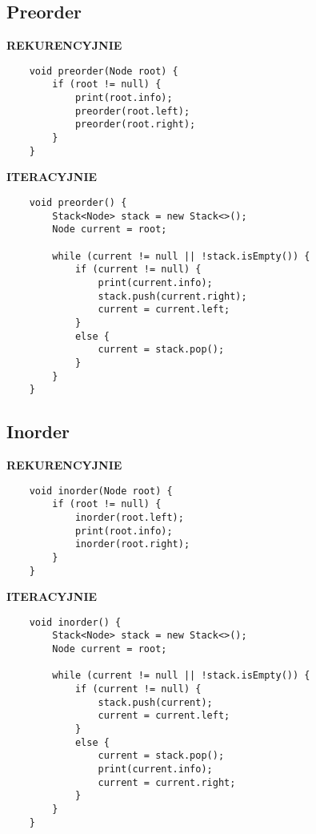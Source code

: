 \documentclass[algorytmy.tex]{subfiles}
\begin{document}
    \subsection{Preorder}
        \textbf{REKURENCYJNIE}
\begin{verbatim}
    void preorder(Node root) {
        if (root != null) {
            print(root.info);
            preorder(root.left);
            preorder(root.right);
        }
    }
\end{verbatim}

        \textbf{ITERACYJNIE}
\begin{verbatim}
    void preorder() {
        Stack<Node> stack = new Stack<>();
        Node current = root;

        while (current != null || !stack.isEmpty()) {
            if (current != null) {
                print(current.info);
                stack.push(current.right);
                current = current.left;
            }
            else {
                current = stack.pop();
            }
        }
    }
\end{verbatim}

\pagebreak

\subsection{Inorder}
        \textbf{REKURENCYJNIE}
\begin{verbatim}
    void inorder(Node root) {
        if (root != null) {
            inorder(root.left);
            print(root.info);
            inorder(root.right);
        }
    }
\end{verbatim}

        \textbf{ITERACYJNIE}
\begin{verbatim}
    void inorder() {
        Stack<Node> stack = new Stack<>();
        Node current = root;

        while (current != null || !stack.isEmpty()) {
            if (current != null) {
                stack.push(current);
                current = current.left;
            }
            else {
                current = stack.pop();
                print(current.info);
                current = current.right;
            }
        }
    }
\end{verbatim}
\end{document}
